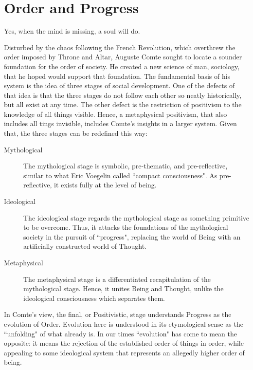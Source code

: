 \section{Order and Progress}

\begin{quotex}
Yes, when the mind is missing, a soul will do. 

\end{quotex}
Disturbed by the chaos following the French Revolution, which overthrew the order imposed by Throne and Altar, Auguste Comte sought to locate a sounder foundation for the order of society. He created a new science of man, sociology, that he hoped would support that foundation. The fundamental basis of his system is the idea of three stages of social development. One of the defects of that idea is that the three stages do not follow each other so neatly historically, but all exist at any time. The other defect is the restriction of positivism to the knowledge of all things visible. Hence, a metaphysical positivism, that also includes all tings invisible, includes Comte's insights in a larger system. Given that, the three stages can be redefined this way:

\begin{description}
\item[Mythological ]

The mythological stage is symbolic, pre-thematic, and pre-reflective, similar to what Eric Voegelin called ``compact consciousness". As pre-reflective, it exists fully at the level of being. 

\item[Ideological ]

The ideological stage regards the mythological stage as something primitive to be overcome. Thus, it attacks the foundations of the mythological society in the pursuit of ``progress", replacing the world of Being with an artificially constructed world of Thought. 

\item[Metaphysical ]

The metaphysical stage is a differentiated recapitulation of the mythological stage. Hence, it unites Being and Thought, unlike the ideological consciousness which separates them. 

\end{description}
In Comte's view, the final, or Positivistic, stage understands Progress as the evolution of Order. Evolution here is understood in its etymological sense as the ``unfolding" of what already is. In our times ``evolution" has come to mean the opposite: it means the rejection of the established order of things in order, while appealing to some ideological system that represents an allegedly higher order of being.

